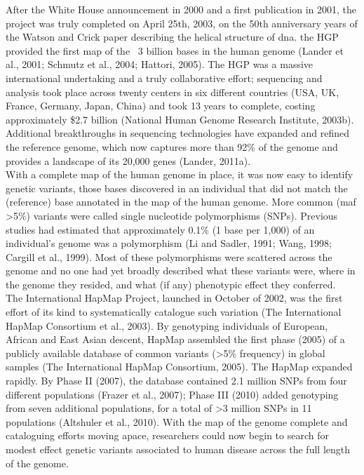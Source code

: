 After the White House announcement in 2000 and a first publication in 2001, the 
project was truly completed on April 25th, 2003, on the 50th anniversary years of the Watson and Crick paper describing the helical structure of \gls{dna}.
the HGP provided the first map of the ~3 billion bases in the human genome (Lander et al., 2001; Schmutz et al., 2004; Hattori, 2005). 
The HGP was a massive international undertaking and a truly collaborative effort; sequencing and analysis took place across twenty centers in six different countries (USA, UK, France, Germany, Japan, China) and took 13 years to complete, costing approximately \$2.7 billion (National Human Genome Research Institute, 2003b).\\ 

Additional breakthroughs in sequencing technologies have expanded and refined the reference genome, which now captures more than 92\% of the genome and provides a landscape of its 20,000 genes (Lander, 2011a).\\

With a complete map of the human genome in place, it was now easy to identify genetic
variants, those bases discovered in an individual that did not match the (reference) base
annotated in the map of the human genome. More common (\gls{maf} >5\%) variants were called single nucleotide polymorphisms (SNPs). 
Previous studies had estimated that approximately 0.1\% (1 base per 1,000) of an individual's genome was a polymorphism (Li and Sadler, 1991; Wang, 1998; Cargill et al., 1999). 
Most of these polymorphisms were scattered across the genome and no one had yet broadly described what these variants were, where in the genome they resided, and what (if any) phenotypic effect they conferred.\\

The International HapMap Project, launched in October of 2002, was the first effort of its
kind to systematically catalogue such variation (The International HapMap Consortium et al., 2003). 
By genotyping individuals of European, African and East Asian descent, HapMap assembled the first phase (2005) of a publicly available database of common variants (>5\% frequency) in global samples (The International HapMap Consortium, 2005). 
The HapMap expanded rapidly. 
By Phase II (2007), the database contained 2.1 million SNPs from four different populations (Frazer et al., 2007); Phase III (2010) added genotyping from seven additional populations, for a total of >3 million SNPs in 11 populations (Altshuler et al., 2010). 
With the map of the genome complete and cataloguing efforts moving apace, researchers could now begin to search for modest effect genetic variants associated to human disease across the full length of the genome.

